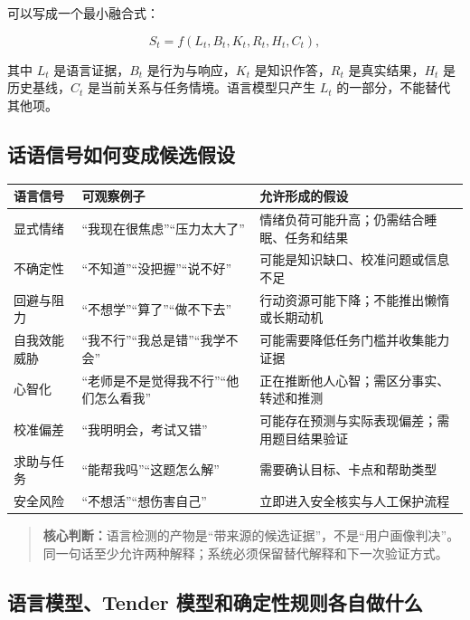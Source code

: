 \documentclass[UTF8,a4paper,11pt]{ctexart}
\newcommand{\keypoint}[1]{\begin{quote}\noindent\textbf{\color{TenderBlue}核心判断：}#1\end{quote}}
\begin{document}
可以写成一个最小融合式：

\begin{equation}
S_t=f(L_t,B_t,K_t,R_t,H_t,C_t),
\end{equation}

其中 $L_t$ 是语言证据，$B_t$ 是行为与响应，$K_t$ 是知识作答，$R_t$ 是真实结果，$H_t$ 是历史基线，$C_t$ 是当前关系与任务情境。语言模型只产生 $L_t$ 的一部分，不能替代其他项。

\subsection{话语信号如何变成候选假设}

\begin{center}
\begin{longtable}{@{}p{2.8cm}p{4.4cm}p{5.9cm}@{}}
\toprule
\textbf{语言信号} & \textbf{可观察例子} & \textbf{允许形成的假设} \\
\midrule
显式情绪 & “我现在很焦虑”“压力太大了” & 情绪负荷可能升高；仍需结合睡眠、任务和结果 \\
不确定性 & “不知道”“没把握”“说不好” & 可能是知识缺口、校准问题或信息不足 \\
回避与阻力 & “不想学”“算了”“做不下去” & 行动资源可能下降；不能推出懒惰或长期动机 \\
自我效能威胁 & “我不行”“我总是错”“我学不会” & 可能需要降低任务门槛并收集能力证据 \\
心智化 & “老师是不是觉得我不行”“他们怎么看我” & 正在推断他人心智；需区分事实、转述和推测 \\
校准偏差 & “我明明会，考试又错” & 可能存在预测与实际表现偏差；需用题目结果验证 \\
求助与任务 & “能帮我吗”“这题怎么解” & 需要确认目标、卡点和帮助类型 \\
安全风险 & “不想活”“想伤害自己” & 立即进入安全核实与人工保护流程 \\
\bottomrule
\end{longtable}
\end{center}

\keypoint{语言检测的产物是“带来源的候选证据”，不是“用户画像判决”。同一句话至少允许两种解释；系统必须保留替代解释和下一次验证方式。}

\subsection{语言模型、Tender 模型和确定性规则各自做什么}
\end{document}
